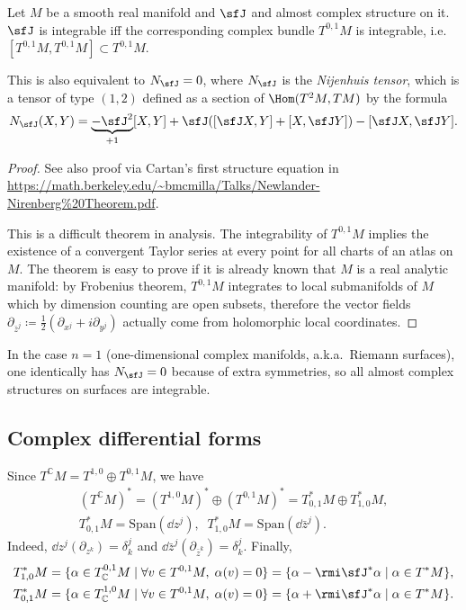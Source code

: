 \begin{thm}
    Let $M$ be a smooth real manifold and $\sfJ$ and almost complex structure on it. $\sfJ$ is integrable iff the corresponding complex bundle $T^{0,1}M$ is integrable, i.e.\ $[T^{0,1}M,T^{0,1}M]\subset T^{0,1}M$.
    
    This is also equivalent to $N_\sfJ=0$, where $N_\sfJ$ is the \emph{Nijenhuis tensor}, which is a tensor of type $(1,2)$ defined as a section of $\Hom(T^2M,TM)$ by the formula
    \[N_\sfJ(X,Y)=\underbrace{-\sfJ^2}_{+1}[X,Y]+\sfJ([\sfJ X,Y]+[X,\sfJ Y])-[\sfJ X,\sfJ Y].\]
\end{thm}
\begin{proof}
    See also proof via Cartan's first structure equation  in \url{https://math.berkeley.edu/~bmcmilla/Talks/Newlander-Nirenberg%20Theorem.pdf}.
    
    This is a difficult theorem in analysis. The integrability of $T^{0,1}M$ implies the existence of a convergent Taylor series at every point for all charts of an atlas on $M$. The theorem is easy to prove if it is already known that $M$ is a real analytic manifold: by Frobenius theorem, $T^{0,1}M$ integrates to local submanifolds of $M$ which by dimension counting are open subsets, therefore the vector fields $\partial_{\bar z^j}\coloneqq\frac12(\partial_{x^j}+i\partial_{y^j})$ actually come from holomorphic local coordinates.
\end{proof}

\begin{rem}
    In the case $n=1$ (one-dimensional complex manifolds, a.k.a.\ Riemann surfaces), one identically has $N_\sfJ=0$ because of extra symmetries, so all almost complex structures on surfaces are integrable.
\end{rem}





\subsection{Complex differential forms}

Since $T^\mathbb{C}M=T^{1,0}\oplus T^{0,1}M$, we have
\begin{gather}
    (T^\mathbb{C}M)^\ast=(T^{1,0}M)^\ast \oplus (T^{0,1}M)^\ast=T^\ast_{0,1}M\oplus T^\ast_{1,0}M,\\ T^\ast_{0,1}M=\mathrm{Span}(\dd z^j),\;\; T^\ast_{1,0}M=\mathrm{Span}(\dd\bar z^j).
\end{gather}
Indeed, $\dd z^j(\partial_{z^k})=\delta^j_k$ and $\dd \bar z^j (\partial_{\bar z^k})=\delta^j_k$.
Finally, 
\begin{align}
    T^\ast_{1,0}M=\{\alpha\in T^{0,1}_{\mathbb{C}}M\mid \forall v\in T^{0,1}M,\; \alpha(v)=0\}=\{\alpha-\rmi\sfJ^\ast\alpha\mid \alpha\in T^\ast M\},\\
    T^\ast_{0,1}M=\{\alpha\in T^{1,0}_{\mathbb{C}}M\mid \forall v\in T^{0,1}M,\; \alpha(v)=0\}=\{\alpha+\rmi\sfJ^\ast\alpha\mid \alpha\in T^\ast M\}.
\end{align}

